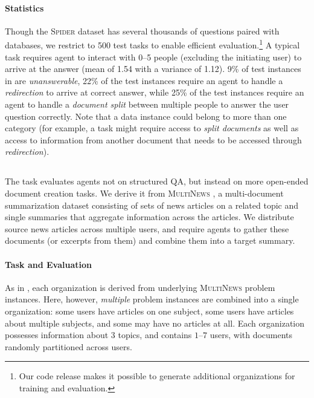 \paragraph{Statistics}
Though the \textsc{Spider} dataset has several thousands of questions paired with databases, we restrict to 500 test tasks to enable efficient evaluation.\footnote{Our code release makes it possible to generate additional organizations for training and evaluation.} A typical task requires agent to interact with 0--5 people (excluding the initiating user) to arrive at the answer (mean of 1.54 with a variance of 1.12).
9\% of test instances in \dataspider{} are \emph{unanswerable},  22\% of the test instances require an agent to handle a \emph{redirection} to arrive at correct answer, while 25\% of the test instances  require an agent to handle a \emph{document split} between multiple people to answer the user question correctly. 
Note that a data instance could belong to more than one category (for example, a task might require access to \emph{split documents} as well as access to information from another document that needs to be accessed through \emph{redirection}).


\subsection{\datanews{}}

The \datanews{} task evaluates agents not on structured QA, but instead on more open-ended document creation tasks. We derive it from  \textsc{MultiNews}  \cite{fabbri2019multi}, a multi-document summarization dataset consisting of sets of news articles on a related topic and single summaries that aggregate information across the articles.
We
distribute source news articles across multiple users, and require agents to gather these documents (or excerpts from them) and combine them into a target summary. %


\paragraph{Task and Evaluation}

As in \dataspider{}, each organization is derived from underlying \textsc{MultiNews} problem instances. Here, however, \emph{multiple} problem instances are combined into a single organization: some users have articles on one subject, some users have articles about multiple subjects, and some may have no articles at all. Each organization possesses information about $3$ topics, and contains $1$--$7$ users, with documents randomly partitioned across users.

